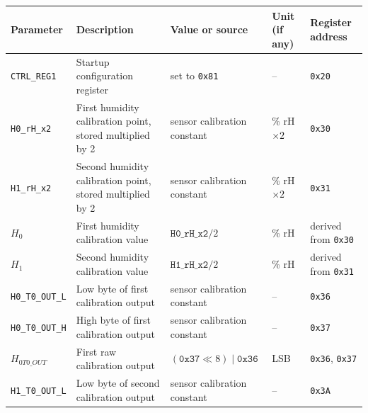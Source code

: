 \begin{table}[H]
	\centering
	\begin{tabularx}{\textwidth}{|>{\raggedright\arraybackslash}X|>{\raggedright\arraybackslash}X|>{\raggedright\arraybackslash}p{2.7cm}|>{\raggedright\arraybackslash}p{2.2cm}|>{\raggedright\arraybackslash}p{3cm}|}
		\hline
		\textbf{Parameter}        & \textbf{Description}                                      & \textbf{Value or source}                    & \textbf{Unit (if any)} & \textbf{Register address}    \\ \hline
		\texttt{CTRL\_REG1}       & Startup configuration register                            & set to \texttt{0x81}                        & --                     & \texttt{0x20}                \\ \hline
		\texttt{H0\_rH\_x2}       & First humidity calibration point, stored multiplied by 2  & sensor calibration constant                 & \% rH $\times 2$       & \texttt{0x30}                \\ \hline
		\texttt{H1\_rH\_x2}       & Second humidity calibration point, stored multiplied by 2 & sensor calibration constant                 & \% rH $\times 2$       & \texttt{0x31}                \\ \hline
		\(H_0\)                   & First humidity calibration value                          & \(\texttt{H0\_rH\_x2}/2\)                   & \% rH                  & derived from \texttt{0x30}   \\ \hline
		\(H_1\)                   & Second humidity calibration value                         & \(\texttt{H1\_rH\_x2}/2\)                   & \% rH                  & derived from \texttt{0x31}   \\ \hline
		\texttt{H0\_T0\_OUT\_L}   & Low byte of first calibration output                      & sensor calibration constant                 & --                     & \texttt{0x36}                \\ \hline
		\texttt{H0\_T0\_OUT\_H}   & High byte of first calibration output                     & sensor calibration constant                 & --                     & \texttt{0x37}                \\ \hline
		\(H_{0T0\_OUT}\)          & First raw calibration output                              & \((\texttt{0x37} \ll 8)\;|\;\texttt{0x36}\) & LSB                    & \texttt{0x36}, \texttt{0x37} \\ \hline
		\texttt{H1\_T0\_OUT\_L}   & Low byte of second calibration output                     & sensor calibration constant                 & --                     & \texttt{0x3A}                \\ \hline

\end{tabularx}
\end{table}
